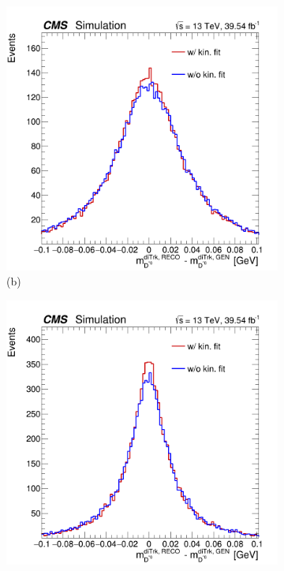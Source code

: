 \begin{figure}[!ht]
\begin{subfigure}[t]{0.50\mylength}
            \includegraphics[width=0.49\mylength]{resources/plots/D0Star_2body_kinematic_fit_residual.png}
            \vspace*{-0.2cm}
            \caption{\footnotesize (b)}
    \end{subfigure}%
    \begin{subfigure}[t]{0.50\mylength}
            \centering
            \includegraphics[width=0.49\mylength]{resources/plots/D0Star_3body_kinematic_fit_residual.png}

\end{subfigure}
\end{figure}
